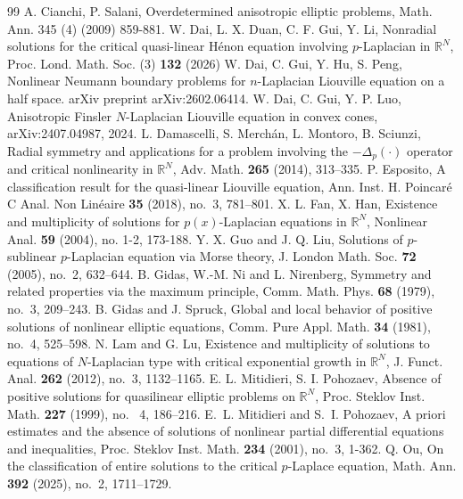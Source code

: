 \documentclass[10pt,a4paper]{amsart}
\numberwithin{equation}{section}
\begin{document}
\begin{thebibliography}{99}
 A. Cianchi, P. Salani, Overdetermined anisotropic elliptic problems, Math. Ann. 345 (4) (2009) 859-881.
 W. Dai, L. X. Duan, C. F. Gui, Y. Li, Nonradial solutions for the critical quasi-linear H\'{e}non equation involving $p$-Laplacian in $\mathbb{R}^N$, Proc. Lond. Math. Soc. (3) {\bf 132} (2026)
 W. Dai, C. Gui, Y. Hu, S. Peng, Nonlinear Neumann boundary problems for $ n $-Laplacian Liouville equation on a half space. arXiv preprint arXiv:2602.06414.
 W. Dai, C. Gui, Y. P. Luo, Anisotropic Finsler $N$-Laplacian Liouville equation in convex cones, arXiv:2407.04987, 2024.
 L. Damascelli, S. Merch\'an, L. Montoro, B. Sciunzi, Radial symmetry and applications for a problem involving the $-\Delta_p(\cdot)$ operator and critical nonlinearity in $\mathbb{R}^N$, Adv. Math. {\bf 265} (2014), 313--335.
 P. Esposito, A classification result for the quasi-linear Liouville equation, Ann. Inst. H. Poincar\'e{} C Anal. Non Lin\'eaire {\bf 35} (2018), no.~3, 781--801.
 X. L. Fan, X. Han, Existence and multiplicity of solutions for $p(x)$-Laplacian equations in $\mathbb{R}^N$, Nonlinear Anal. {\bf 59} (2004), no. 1-2, 173-188.
 Y. X. Guo and J. Q. Liu, Solutions of $p$-sublinear $p$-Laplacian equation via Morse theory, J. London Math. Soc. {\bf 72} (2005), no.~2, 632--644.
 B. Gidas, W.-M. Ni and L. Nirenberg, Symmetry and related properties via the maximum principle, Comm. Math. Phys. {\bf 68} (1979), no.~3, 209--243.
 B. Gidas and J. Spruck, Global and local behavior of positive solutions of nonlinear elliptic equations, Comm. Pure Appl. Math. {\bf 34} (1981), no.~4, 525--598.
 N. Lam and G. Lu, Existence and multiplicity of solutions to equations of $N$-Laplacian type with critical exponential growth in $\mathbb{R}^N$, J. Funct. Anal. {\bf 262} (2012), no.~3, 1132--1165.
 E. L. Mitidieri, S. I. Pohozaev, Absence of positive solutions for quasilinear elliptic problems on $\mathbb{R}^N$, Proc. Steklov Inst. Math. {\bf 227 } (1999), no. ~4, 186–216.
 E.~L. Mitidieri and S.~I. Pohozaev, A priori estimates and the absence of solutions of nonlinear partial differential equations and inequalities, Proc. Steklov Inst. Math. {\bf 234} (2001), no.~3, 1-362.
 Q. Ou, On the classification of entire solutions to the critical $p$-Laplace equation, Math. Ann. {\bf 392} (2025), no.~2, 1711--1729.

\end{thebibliography}
\end{document}
